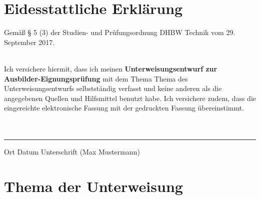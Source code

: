 \documentclass[12pt, a4paper, oneside, titlepage]{article}
\renewcommand{\headrulewidth}{0.4pt}	%
\newcommand{\autor}{Max Mustermann}
\begin{document}
\pagebreak


\pagestyle{plain}
\setlength\headheight{0pt}	


\section*{Eidesstattliche Erklärung}
\begin{itshape}
Gemäß § 5 (3) der \glqq Studien- und Prüfungsordnung DHBW Technik\grqq{} vom 29. September 2017. 

\ \\ 
\noindent
Ich versichere hiermit, dass ich meinen \textbf{Unterweisungsentwurf zur Ausbilder-Eignungsprüfung} mit dem Thema \glqq Thema des Unterweisungsentwurfs \grqq{} selbstständig verfasst und keine anderen als die angegebenen Quellen und Hilfsmittel benutzt habe.
Ich versichere zudem, dass die eingereichte elektronische Fassung mit der gedruckten Fassung übereinstimmt.
\ \\
\ \\
\ \\

\hrule

Ort \hspace{1.5cm} Datum \hspace{2.5cm}   Unterschrift (\autor)

\end{itshape}

\pagebreak
\tableofcontents							%

\pagebreak


\pagebreak


\pagestyle{fancy}
\fancyhf{}
\fancyhead[L]{\nouppercase\leftmark}
\fancyhead[R]{\thepage}
\renewcommand{\headrulewidth}{0.5pt}
\setlength\headheight{15pt}	
\pagebreak


\section{Thema der Unterweisung}  \label{kapThemaUnterweisung}

\pagebreak
\end{document}
